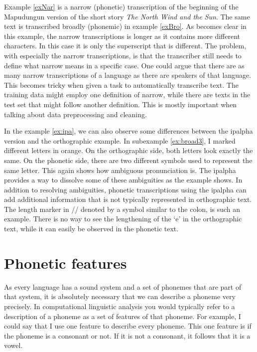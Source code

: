 Example \ref{exNar} is a narrow (phonetic) transcription of the beginning of the Mapudungun version of the short story \textit{The North Wind and the Sun}. The same text is transcribed broadly (phonemic) in example \ref{exBro}. As becomes clear in this example, the narrow transcriptions is longer as it contains more different characters. In this case it is only the superscript  that is different. The problem, with especially the narrow transcriptions, is that the transcriber still needs to define what narrow means in a specific case. One could argue that there are as many narrow transcriptions of a language as there are speakers of that language. This becomes tricky when given a task to automatically transcribe text. The training data might employ one definition of narrow, while there are texts in the test set that might follow another definition. This is mostly important when talking about data preprocessing and cleaning.

In the example \ref{ex:ipa}, we can also observe some differences between the \ac{ipalpha} version and the orthographic example. In subexample \ref{ex:broad3}, I marked different letters in orange. On the orthographic side, both letters look exactly the same. On the phonetic side, there are two different symbols used to represent the same letter. This again shows how ambiguous pronunciation is. The \ac{ipalpha} provides a way to dissolve some of these ambiguities as the example shows. In addition to resolving ambiguities, phonetic transcriptions using the \ac{ipalpha} can add additional information that is not typically represented in orthographic text. The length marker in // denoted by a symbol similar to the colon, is such an example. There is no way to see the lengthening of the `e' in the orthographic text, while it can easily be observed in the phonetic text.

\section{Phonetic features}
As every language has a sound system and a set of phonemes that are part of that system, it is absolutely necessary that we can describe a phoneme very precisely. In computational linguistic analysis you would typically refer to a description of a phoneme as a set of features of that phoneme. For example, I could say that I use one feature to describe every phoneme. This one feature is if the phoneme is a consonant or not. If it is not a consonant, it follows that it is a vowel. 

